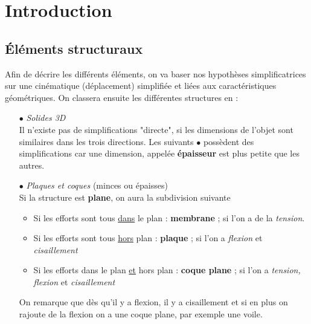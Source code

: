 \chapter{Introduction}

\section{Éléments structuraux}
Afin de décrire les différents éléments, on va baser nos hypothèses 
simplificatrices sur une cinématique (déplacement) simplifiée et 
liées aux caractéristiques géométriques. On classera ensuite les 
différentes structures en : 
\begin{itemize}
\item[$\bullet$] \textit{Solides 3D}\\
Il n'existe pas de simplifications "directe", si les dimensions de 
l'objet sont similaires dans les trois directions. Les suivants 
$\bullet$ possèdent des simplifications car une dimension, appelée 
\textbf{épaisseur} est plus petite que les autres.

\item[$\bullet$] \textit{Plaques et coques} (minces ou épaisses)\\
Si la structure est \textbf{plane}, on aura la subdivision suivante 
	\begin{itemize}
	\item Si les efforts sont tous \underline{dans} le plan : \textbf{
	membrane} ; si l'on a de la \textit{tension}.
	\item Si les efforts sont tous \underline{hors} plan  : \textbf{
	plaque} ; si l'on a \textit{flexion} et \textit{cisaillement}
	\item Si les efforts dans le plan \underline{et} hors plan : \textbf{
	coque plane} ; si l'on a \textit{tension, flexion} et \textit{
	cisaillement}
	\end{itemize}
On remarque que dès qu'il y a flexion, il y a cisaillement et si 
en plus on rajoute de la flexion on a une coque plane, par exemple 
une voile.


\end{itemize}
